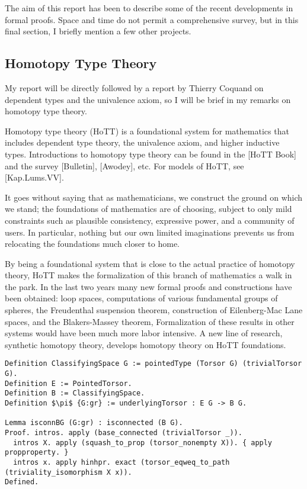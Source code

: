 \documentclass[brochure,english,12pt]{bourbaki}
\theoremstyle{plain}
\begin{document}
The aim of this report has been to describe some of the recent developments in formal proofs.
Space and time do not permit a comprehensive survey, but in this final section, I briefly mention
a few other projects.


\subsection{Homotopy Type Theory}

My report will be directly followed by a report by Thierry Coquand on dependent types and
the univalence axiom, so I will be brief in my remarks on homotopy type theory.

Homotopy type theory (HoTT) is a foundational system for mathematics that includes
dependent type theory, the univalence axiom, and higher inductive types.  
Introductions to homotopy type theory can be found in the [HoTT Book] and the survey [Bulletin], [Awodey], etc.
For models of HoTT, see [Kap.Lums.VV].

It goes without saying that as mathematicians, we construct the ground on which we stand;
the foundations of mathematics are of choosing, subject
to only mild constraints such as plausible consistency, expressive power, and a community of users.
In particular, nothing but our own limited imaginations prevents us from relocating the
foundations much closer to home.

By being a foundational system that is close to the actual practice of homotopy theory,
HoTT makes the formalization of this branch of mathematics a walk in the park.
In the last two years many new formal proofs and constructions have been obtained: 
loop spaces, computations of various
fundamental groups of spheres, the Freudenthal suspension theorem,
construction of Eilenberg-Mac Lane spaces, and the Blakers-Massey theorem,
Formalization of these results in other systems would have been much more labor intensive.
A new line of research, synthetic homotopy theory, develops homotopy theory on HoTT foundations.

\begin{lstlisting}[keepspaces=true,stringstyle=\tt,basicstyle=\small,frame=single,framesep=8pt,mathescape,morekeywords={Definition,Lemma,Proof,Defined},columns=flexible,caption={Construction of classifying spaces as the type of a torsor in Univalent foundations.  The proof that the classifying space $BG$ is connected. --D. Grayson.}]
Definition ClassifyingSpace G := pointedType (Torsor G) (trivialTorsor G).
Definition E := PointedTorsor.
Definition B := ClassifyingSpace.
Definition $\pi$ {G:gr} := underlyingTorsor : E G -> B G.

Lemma isconnBG (G:gr) : isconnected (B G).
Proof. intros. apply (base_connected (trivialTorsor _)).
  intros X. apply (squash_to_prop (torsor_nonempty X)). { apply propproperty. }
  intros x. apply hinhpr. exact (torsor_eqweq_to_path (triviality_isomorphism X x)). 
Defined.
\end{lstlisting}
\end{document}
